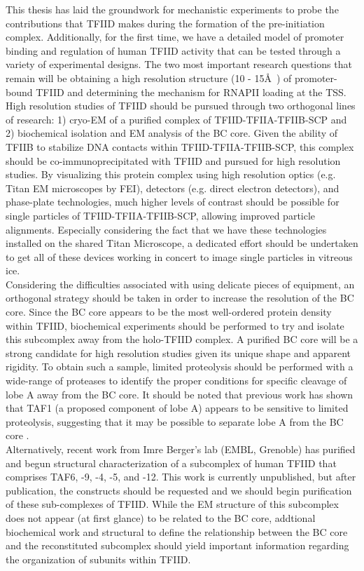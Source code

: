 \indent This thesis has laid the groundwork for mechanistic experiments to probe the contributions that TFIID makes during the formation of the pre-initiation complex. Additionally, for the first time, we have a detailed model of promoter binding and regulation of human TFIID activity that can be tested through a variety of experimental designs. The two most important research questions that remain will be obtaining a high resolution structure (10 - 15\AA\ ) of promoter-bound TFIID and determining the mechanism for RNAPII loading at the TSS.\\
 \indent High resolution studies of TFIID should be pursued through two orthogonal lines of research: 1) cryo-EM of a purified complex of TFIID-TFIIA-TFIIB-SCP and 2) biochemical isolation and EM analysis of the BC core. Given the ability of TFIIB to stabilize DNA contacts within TFIID-TFIIA-TFIIB-SCP, this complex should be co-immunoprecipitated with TFIID and pursued for high resolution studies. By visualizing this protein complex using high resolution optics (e.g. Titan EM microscopes by FEI), detectors (e.g. direct electron detectors), and phase-plate technologies, much higher levels of contrast should be possible for single particles of TFIID-TFIIA-TFIIB-SCP, allowing improved particle alignments. Especially considering the fact that we have these technologies installed on the shared Titan Microscope, a dedicated effort should be undertaken to get all of these devices working in concert to image single particles in vitreous ice.\\
\indent Considering the difficulties associated with using delicate pieces of equipment, an orthogonal strategy should be taken in order to increase the resolution of the BC core. Since the BC core appears to be the most well-ordered protein density within TFIID, biochemical experiments should be performed to try and isolate this subcomplex away from the holo-TFIID complex. A purified BC core will be a strong candidate for high resolution studies given its unique shape and apparent rigidity. To obtain such a sample, limited proteolysis should be performed with a wide-range of proteases to identify the proper conditions for specific cleavage of lobe A away from the BC core. It should be noted that previous work has shown that TAF1 (a proposed component of lobe A) appears to be sensitive to limited proteolysis, suggesting that it may be possible to separate lobe A from the BC core \cite{Ozer_1998}.\\
\indent Alternatively, recent work from Imre Berger's lab (EMBL, Grenoble) has purified and begun structural characterization of a subcomplex of human TFIID that comprises TAF6, -9, -4, -5, and -12. This work is currently unpublished, but after publication, the constructs should be requested and we should begin purification of these sub-complexes of TFIID. While the EM structure of this subcomplex does not appear (at first glance) to be related to the BC core, addtional biochemical work and structural to define the relationship between the BC core and the reconstituted subcomplex should yield important information regarding the organization of subunits within TFIID.\\

